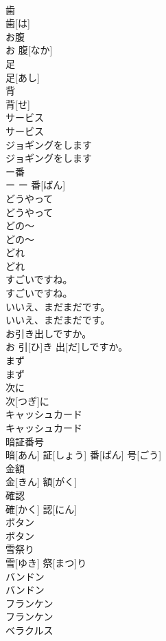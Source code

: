 \documentclass[8pt]{extreport}
\begin{document}
\begin{CJK}{UTF8}{min}
\\	歯	
\\	歯[は]		
\\	お腹	
\\	お 腹[なか]		
\\	足	
\\	足[あし]		
\\	背	
\\	背[せ]		
\\	サービス	
\\	サービス		
\\	ジョギングをします	
\\	ジョギングをします		
\\	ー番	
\\	ー	ー 番[ばん]		
\\	どうやって	
\\	どうやって		
\\	どの～	
\\	どの～		
\\	どれ	
\\	どれ		
\\	すごいですね。	
\\	すごいですね。		
\\	いいえ、まだまだです。	
\\	いいえ、まだまだです。		
\\	お引き出しですか。	
\\	お 引[ひ]き 出[だ]しですか。		
\\	まず	
\\	まず		
\\	次に	
\\	次[つぎ]に		
\\	キャッシュカード	
\\	キャッシュカード		
\\	暗証番号	
\\	暗[あん] 証[しょう] 番[ばん] 号[ごう]		
\\	金額	
\\	金[きん] 額[がく]		
\\	確認	
\\	確[かく] 認[にん]		
\\	ボタン	
\\	ボタン		
\\	雪祭り	
\\	雪[ゆき] 祭[まつ]り		
\\	バンドン	
\\	バンドン		
\\	フランケン	
\\	フランケン		
\\	ベラクルス	

\end{CJK}
\end{document}
